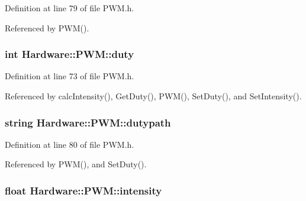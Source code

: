 Definition at line 79 of file P\+W\+M.\+h.



Referenced by P\+W\+M().

\hypertarget{class_hardware_1_1_p_w_m_a3309b2645c4c817384d91f33f0df5d64}{}
\subsubsection[{duty}]{\setlength{\rightskip}{0pt plus 5cm}int Hardware\+::\+P\+W\+M\+::duty\hspace{0.3cm}{\ttfamily [private]}}\label{class_hardware_1_1_p_w_m_a3309b2645c4c817384d91f33f0df5d64}


Definition at line 73 of file P\+W\+M.\+h.



Referenced by calc\+Intensity(), Get\+Duty(), P\+W\+M(), Set\+Duty(), and Set\+Intensity().

\hypertarget{class_hardware_1_1_p_w_m_a53311e9df6960751465d5f0b81192226}{}
\subsubsection[{dutypath}]{\setlength{\rightskip}{0pt plus 5cm}string Hardware\+::\+P\+W\+M\+::dutypath\hspace{0.3cm}{\ttfamily [private]}}\label{class_hardware_1_1_p_w_m_a53311e9df6960751465d5f0b81192226}


Definition at line 80 of file P\+W\+M.\+h.



Referenced by P\+W\+M(), and Set\+Duty().

\hypertarget{class_hardware_1_1_p_w_m_afcfc81ddeeb9c510ad4d00b215477d7a}{}
\subsubsection[{intensity}]{\setlength{\rightskip}{0pt plus 5cm}float Hardware\+::\+P\+W\+M\+::intensity\hspace{0.3cm}{\ttfamily [private]}}\label{class_hardware_1_1_p_w_m_afcfc81ddeeb9c510ad4d00b215477d7a}


